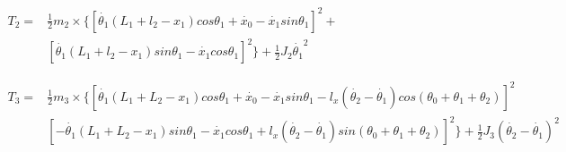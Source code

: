 \begin{math}
\begin{aligned}
T_2 = & \frac{1}{2}m_2\times\{[\dot{\theta_1}(L_1+l_2-x_1)cos\theta_1+\dot{x_0}-\dot{x_1}sin\theta_1]^2 + \\
& [\dot{\theta_1}(L_1+l_2-x_1)sin\theta_1-\dot{x_1}cos\theta_1]^2\} + \frac{1}{2}J_2\dot{\theta_1}^2
\end{aligned}
\end{math}



\begin{math}
\begin{aligned}
T_3 =  &\frac{1}{2}m_3\times \{[\dot{\theta_1}(L_1+L_2-x_1)cos\theta_1+\dot{x_0}-    \dot{x_1}sin\theta_1-l_x(\dot{\theta_2}-\dot{\theta_1})cos(\theta_0+\theta_1+\theta_2)]^2  \\
& [-\dot{\theta_1}(L_1+L_2-x_1)sin\theta_1 -\dot{x_1}cos\theta_1+l_x(\dot{\theta_2}-\dot{\theta_1})sin(\theta_0+\theta_1+\theta_2)]^2\}+\frac{1}{2}J_3(\dot{\theta_2}-\dot{\theta_1})^2
\end{aligned}
\end{math}

